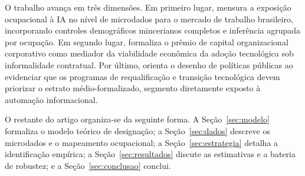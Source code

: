 O trabalho avança em três dimensões. Em primeiro lugar, mensura a exposição ocupacional à IA no nível de microdados para o mercado de trabalho brasileiro, incorporando controles demográficos mincerianos completos e inferência agrupada por ocupação. Em segundo lugar, formaliza o prêmio de capital organizacional corporativo como mediador da viabilidade econômica da adoção tecnológica sob informalidade contratual. Por último, orienta o desenho de políticas públicas ao evidenciar que os programas de requalificação e transição tecnológica devem priorizar o estrato médio-formalizado, segmento diretamente exposto à automação informacional.

O restante do artigo organiza-se da seguinte forma. A Seção~\ref{sec:modelo} formaliza o modelo teórico de designação; a Seção~\ref{sec:dados} descreve os microdados e o mapeamento ocupacional; a Seção~\ref{sec:estrategia} detalha a identificação empírica; a Seção~\ref{sec:resultados} discute as estimativas e a bateria de robustez; e a Seção~\ref{sec:conclusao} conclui.
